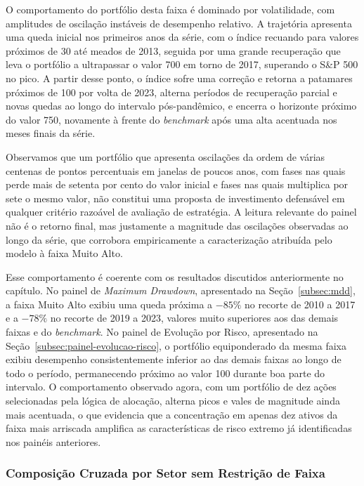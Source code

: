 O comportamento do portfólio desta faixa é dominado por volatilidade, com amplitudes de oscilação instáveis de desempenho relativo. A trajetória apresenta uma queda inicial nos primeiros anos da série, com o índice recuando para valores próximos de 30 até meados de 2013, seguida por uma grande recuperação que leva o portfólio a ultrapassar o valor 700 em torno de 2017, superando o S\&P 500 no pico. A partir desse ponto, o índice sofre uma correção e retorna a patamares próximos de 100 por volta de 2023, alterna períodos de recuperação parcial e novas quedas ao longo do intervalo pós-pandêmico, e encerra o horizonte próximo do valor 750, novamente à frente do \textit{benchmark} após uma alta acentuada nos meses finais da série.

Observamos que um portfólio que apresenta oscilações da ordem de várias centenas de pontos percentuais em janelas de poucos anos, com fases nas quais perde mais de setenta por cento do valor inicial e fases nas quais multiplica por sete o mesmo valor, não constitui uma proposta de investimento defensável em qualquer critério razoável de avaliação de estratégia. A leitura relevante do painel não é o retorno final, mas justamente a magnitude das oscilações observadas ao longo da série, que corrobora empiricamente a caracterização atribuída pelo modelo à faixa Muito Alto.

Esse comportamento é coerente com os resultados discutidos anteriormente no capítulo. No painel de \textit{Maximum Drawdown}, apresentado na Seção~\ref{subsec:mdd}, a faixa Muito Alto exibiu uma queda próxima a $-85\%$ no recorte de 2010 a 2017 e a $-78\%$ no recorte de 2019 a 2023, valores muito superiores aos das demais faixas e do \textit{benchmark}. No painel de Evolução por Risco, apresentado na Seção~\ref{subsec:painel-evolucao-risco}, o portfólio equiponderado da mesma faixa exibiu desempenho consistentemente inferior ao das demais faixas ao longo de todo o período, permanecendo próximo ao valor 100 durante boa parte do intervalo. O comportamento observado agora, com um portfólio de dez ações selecionadas pela lógica de alocação, alterna picos e vales de magnitude ainda mais acentuada, o que evidencia que a concentração em apenas dez ativos da faixa mais arriscada amplifica as características de risco extremo já identificadas nos painéis anteriores.

\subsubsection{Composição Cruzada por Setor sem Restrição de Faixa}
\label{subsubsec:validacao-cruzada-setor}

